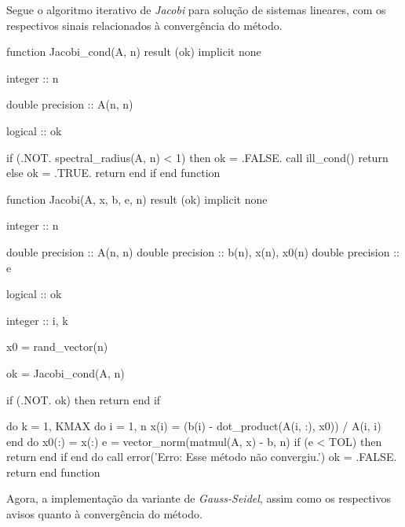 \documentclass{homework}
\begin{document}
	\quest%
	
	
	Segue o algoritmo iterativo de \textit{Jacobi} para solução de sistemas lineares, com os respectivos sinais relacionados à convergência do método.
	
	\begin{fortran}
	function Jacobi_cond(A, n) result (ok)
		implicit none
		
		integer :: n
		
		double precision :: A(n, n)
		
		logical :: ok
		
		if (.NOT. spectral_radius(A, n) < 1) then
			ok = .FALSE.
			call ill_cond()
			return
		else
			ok = .TRUE.
			return
		end if
	end function	
		
	function Jacobi(A, x, b, e, n) result (ok)
		implicit none
		
		integer :: n
		
		double precision :: A(n, n)
		double precision :: b(n), x(n), x0(n)
		double precision :: e
		
		logical :: ok
		
		integer :: i, k
		
		x0 = rand_vector(n)
		
		ok = Jacobi_cond(A, n)
		
		if (.NOT. ok) then
			return
		end if
		
		do k = 1, KMAX
			do i = 1, n
				x(i) = (b(i) - dot_product(A(i, :), x0)) / A(i, i)
			end do
			x0(:) = x(:)
			e = vector_norm(matmul(A, x) - b, n)
			if (e < TOL) then
				return
			end if
		end do
		call error('Erro: Esse método não convergiu.')
		ok = .FALSE.
		return
	end function
	\end{fortran}
	
	
	Agora, a implementação da variante de \textit{Gauss-Seidel}, assim como os respectivos avisos quanto à convergência do método.
	
\end{document}
